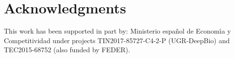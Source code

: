 \documentclass[10pt,journal,compsoc]{IEEEtran}
\begin{document}


\section*{Acknowledgments}

This work has been supported in part by: Ministerio espa\~{n}ol de
Econom\'{\i}a y Competitividad under projects  TIN2017-85727-C4-2-P (UGR-DeepBio) and TEC2015-68752 (also funded by FEDER).





\end{document}
